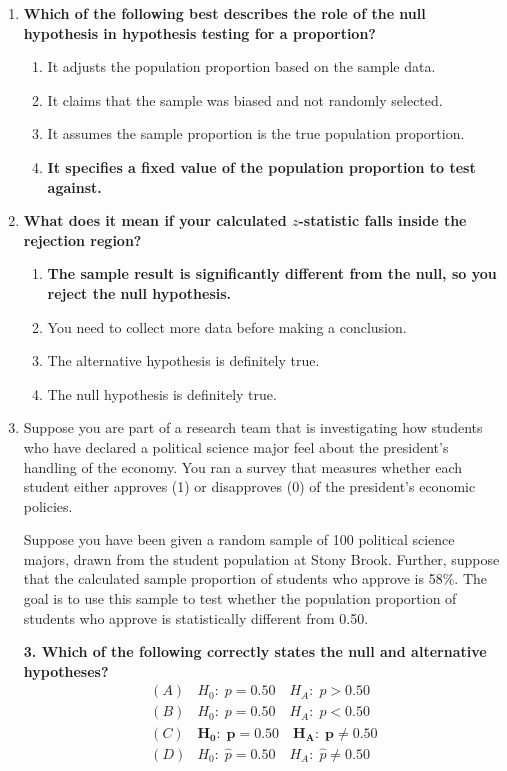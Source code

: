 \documentclass[12pt]{article}
\begin{document}
\begin{enumerate}

\item \textbf{Which of the following best describes the role of the null hypothesis in hypothesis testing for a proportion?}
    \begin{enumerate}
        \item It adjusts the population proportion based on the sample data.
        \item It claims that the sample was biased and not randomly selected.
        \item It assumes the sample proportion is the true population proportion.
        \item \textbf{It specifies a fixed value of the population proportion to test against.}
    \end{enumerate}

\item \textbf{What does it mean if your calculated $z$-statistic falls inside the rejection region?}
    \begin{enumerate}
        \item \textbf{The sample result is significantly different from the null, so you reject the null hypothesis.}
        \item You need to collect more data before making a conclusion.
        \item The alternative hypothesis is definitely true.
        \item The null hypothesis is definitely true.
    \end{enumerate}

\item Suppose you are part of a research team that is investigating how students who have declared a political science major feel about the president’s handling of the economy. You ran a survey that measures whether each student either approves (1) or disapproves (0) of the president’s economic policies. \newline 

Suppose you have been given a random sample of 100 political science majors, drawn from the student population at Stony Brook. Further, suppose that the calculated sample proportion of students who approve is 58\%. The goal is to use this sample to test whether the population proportion of students who approve is statistically different from 0.50.  \newline 

\textbf{3. Which of the following correctly states the null and alternative hypotheses?}
\[
\begin{array}{ll}
(A)& H_{0}\!:\; p = 0.50 \quad H_{A}\!:\; p > 0.50\\[4pt]
(B)& H_{0}\!:\; p = 0.50 \quad H_{A}\!:\; p < 0.50\\[4pt]
(C)& \mathbf{H_{0}\!:\; p = 0.50 \quad H_{A}\!:\; p \neq 0.50}\\[4pt]
(D)& H_{0}\!:\; \hat{p} = 0.50 \quad H_{A}\!:\; \hat{p} \neq 0.50
\end{array}
\]


\end{enumerate}
\end{document}
